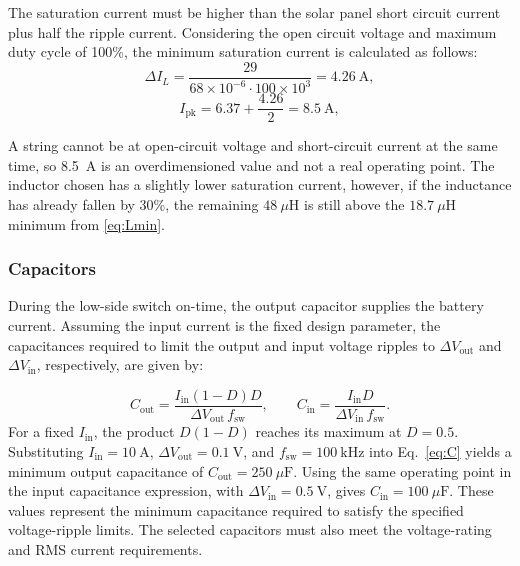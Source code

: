 \documentclass[conference]{IEEEtran}
\begin{document}
    The saturation current must be higher than the solar panel short circuit current plus half the ripple current. Considering the open circuit voltage and maximum duty cycle of 100\%, the minimum saturation current is calculated as follows: 
    \begin{equation}
        \Delta I_L = \frac{29}{68\times 10^{-6}\cdot 100\times 10^{3}} = 4.26~\mathrm{A},
    \end{equation}
    \begin{equation}
        I_{\mathrm{pk}} = 6.37 + \frac{4.26}{2} = 8.5~\mathrm{A},
    \end{equation}

    A string cannot be at open-circuit voltage and short-circuit current at the same time, so 8.5~A is an overdimensioned value and not a real operating point. The inductor chosen has a slightly lower saturation current, however, if the inductance has already fallen by 30\%, the remaining $48~\mu\mathrm{H}$ is still above the $18.7~\mu\mathrm{H}$ minimum from \eqref{eq:Lmin}. 

    \subsubsection{Capacitors}
    During the low-side switch on-time, the output capacitor supplies the battery current. Assuming the input current is the fixed design parameter, the capacitances required to limit the output and input voltage ripples to $\Delta V_{\mathrm{out}}$ and $\Delta V_{\mathrm{in}}$, respectively, are given by:

    \begin{equation}
        C_{\mathrm{out}} = \frac{I_{\mathrm{in}}(1-D)D}{\Delta V_{\mathrm{out}}\, f_{\mathrm{sw}}},
        \qquad
        C_{\mathrm{in}} = \frac{I_{\mathrm{in}} D}{\Delta V_{\mathrm{in}}\, f_{\mathrm{sw}}}.
        \label{eq:C}
    \end{equation}
    For a fixed $I_{\mathrm{in}}$, the product $D(1-D)$ reaches its maximum at $D=0.5$. Substituting $I_{\mathrm{in}} = 10~\mathrm{A}$, $\Delta V_{\mathrm{out}} = 0.1~\mathrm{V}$, and $f_{\mathrm{sw}} = 100~\mathrm{kHz}$ into Eq.~\eqref{eq:C} yields a minimum output capacitance of $C_{\mathrm{out}} = 250~\mu\mathrm{F}$. Using the same operating point in the input capacitance expression, with $\Delta V_{\mathrm{in}} = 0.5~\mathrm{V}$, gives $C_{\mathrm{in}} = 100~\mu\mathrm{F}$. These values represent the minimum capacitance required to satisfy the specified voltage-ripple limits. The selected capacitors must also meet the voltage-rating and RMS current requirements.
\end{document}
